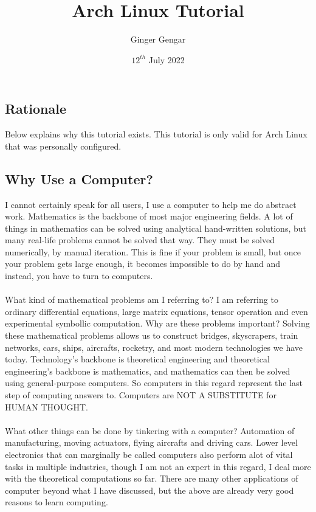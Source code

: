 \documentclass[a4paper, 12pt]{report}
\begin{document}
\title{Arch Linux Tutorial}
\author{Ginger Gengar}
\date{$12^{th}$ July 2022}
\maketitle
\newpage

\tableofcontents
\newpage

\begin{center}












\section{Rationale}
\begin{comment}
\end{comment}
Below explains why this tutorial exists. This tutorial is only valid for Arch Linux that was personally configured. 
\subsection{Why Use a Computer?}
\begin{comment}
\end{comment}
I cannot certainly speak for all users, I use a computer to help me do abstract work. Mathematics is the backbone of most major engineering fields. A lot of things in mathematics can be solved using analytical hand-written solutions, but many real-life problems cannot be solved that way. They must be solved numerically, by manual iteration. This is fine if your problem is small, but once your problem gets large enough, it becomes impossible to do by hand and instead, you have to turn to computers. 
\\~\\What kind of mathematical problems am I referring to? I am referring to ordinary differential equations, large matrix equations, tensor operation and even experimental symbollic computation. Why are these problems important? Solving these mathematical problems allows us to construct bridges, skyscrapers, train networks, cars, ships, aircrafts, rocketry, and most modern technologies we have today. Technology's backbone is theoretical engineering and theoretical engineering's backbone is mathematics, and mathematics can then be solved using general-purpose computers. So computers in this regard represent the last step of computing answers to. Computers are NOT A SUBSTITUTE for HUMAN THOUGHT.
\\~\\What other things can be done by tinkering with a computer? Automation of manufacturing, moving actuators, flying aircrafts and driving cars. Lower level electronics that can marginally be called computers also perform alot of vital tasks in multiple industries, though I am not an expert in this regard, I deal more with the theoretical computations so far. There are many other applications of computer beyond what I have discussed, but the above are already very good reasons to learn computing.


\end{center}
\end{document}
